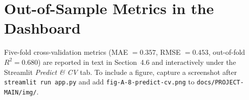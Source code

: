 \documentclass[12pt]{report}
\begin{document}
	\section{Out-of-Sample Metrics in the Dashboard}
	\label{sec:oof-cv-note}
	Five-fold cross-validation metrics (MAE $= 0.357$, RMSE $= 0.453$, out-of-fold $R^2 = 0.680$) are reported in text in Section~4.6 and interactively under the Streamlit \emph{Predict \& CV} tab. To include a figure, capture a screenshot after \texttt{streamlit run app.py} and add \texttt{fig-A-8-predict-cv.png} to \texttt{docs/PROJECT-MAIN/img/}.
	
	\newpage
	
	
\end{document}
